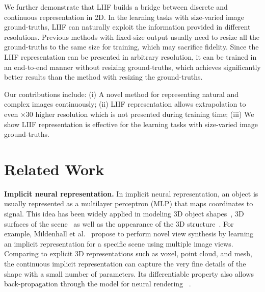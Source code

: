 \documentclass[final]{cvpr}
\begin{document}
We further demonstrate that LIIF builds a bridge between discrete and continuous representation in 2D. In the learning tasks with size-varied image ground-truths, LIIF can naturally exploit the information provided in different resolutions. Previous methods with fixed-size output usually need to resize all the ground-truths to the same size for training, which may sacrifice fidelity. Since the LIIF representation can be presented in arbitrary resolution, it can be trained in an end-to-end manner without resizing ground-truths, which achieves significantly better results than the method with resizing the ground-truths.

Our contributions include: (i) A novel method for representing natural and complex images continuously; (ii) LIIF representation allows extrapolation to even $\times 30$ higher resolution which is not presented during training time; (iii) We show LIIF representation is effective for the learning tasks with size-varied image ground-truths.

\section{Related Work}

\textbf{Implicit neural representation.} In implicit neural representation, an object is usually represented as a multilayer perceptron (MLP) that maps coordinates to signal. This idea has been widely applied in modeling 3D object shapes~\cite{chen2019learning,michalkiewicz2019implicit,atzmon2020sal,gropp2020implicit}, 3D surfaces of the scene~\cite{sitzmann2019scene,jiang2020local,peng2020convolutional,chabra2020deep} as well as the appearance of the 3D structure~\cite{oechsle2019texture,niemeyer2020differentiable,mildenhall2020nerf}. For example, Mildenhall et al.~\cite{mildenhall2020nerf} propose to perform novel view synthesis by learning an implicit representation for a specific scene using multiple image views. Comparing to explicit 3D representations such as voxel, point cloud, and mesh, the continuous implicit representation can capture the very fine details of the shape with a small number of parameters. Its differentiable property also allows back-propagation through the model for neural rendering~\cite{sitzmann2019scene} . 
\end{document}
